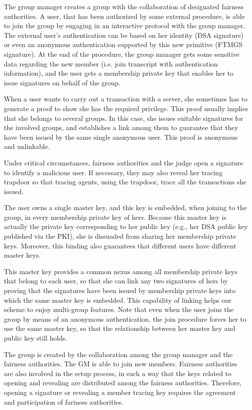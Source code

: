 \documentclass[a4paper]{article}
\begin{document}
The group manager creates a group with the collaboration of designated
fairness authorities. A user, that has been authorized by some
external procedure, is able to join the group by engaging in an
interactive protocol with the group manager. The external user’s
authentication can be based on her identity (DSA signature) or even an
anonymous authentication supported by this new primitive (FTMGS
signature). At the end of the procedure, the group manager gets some
sensitive data regarding the new member (i.e. join transcript with
authentication information), and the user gets a membership private
key that enables her to issue signatures on behalf of the group.

When a user wants to carry out a transaction with a server, she
sometimes has to generate a proof to show she has the required
privilege. This proof usually implies that she belongs to several
groups. In this case, she issues suitable signatures for the involved
groups, and establishes a link among them to guarantee that they have
been issued by the same single anonymous user. This proof is anonymous
and unlinkable.

Under critical circumstances, fairness authorities and the judge open
a signature to identify a malicious user. If necessary, they may also
reveal her tracing trapdoor so that tracing agents, using the
trapdoor, trace all the transactions she issued.

The user owns a single master key, and this key is embedded, when
joining to the group, in every membership private key of hers. Because
this master key is actually the private key corresponding to her
public key (e.g., her DSA public key published via the PKI), she is
dissuaded from sharing her membership private keys. Moreover, this
binding also guarantees that different users have different master
keys.

This master key provides a common nexus among all membership private
keys that belong to each user, so that she can link any two signatures
of hers by proving that the signatures have been issued by membership
private keys into which the same master key is embedded. This
capability of linking helps our scheme to enjoy multi-group
features. Note that even when the user joins the group by means of an
anonymous authentication, the join procedure forces her to use the
same master key, so that the relationship between her master key and
public key still holds.

The group is created by the collaboration among the group manager and
the fairness authorities.  The GM is able to join new
members. Fairness authorities are also involved in the setup process,
in such a way that the keys related to opening and revealing are
distributed among the fairness authorities. Therefore, opening a
signature or revealing a member tracing key requires the agreement and
participation of fariness authorities.
\end{document}
